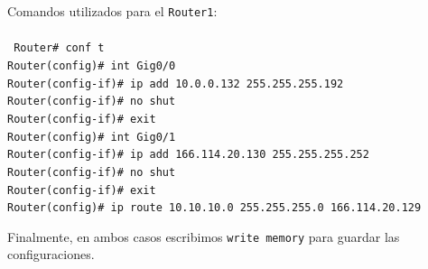 \pagebreak
Comandos utilizados para el \texttt{Router1}: \\{ }\\
\texttt{
\noindent
Router\# conf t \\
Router(config)\# int Gig0/0 \\
Router(config-if)\# ip add 10.0.0.132 255.255.255.192 \\
Router(config-if)\# no shut \\
Router(config-if)\# exit \\
Router(config)\# int Gig0/1 \\
Router(config-if)\# ip add 166.114.20.130 255.255.255.252 \\
Router(config-if)\# no shut \\
Router(config-if)\# exit \\
Router(config)\# ip route 10.10.10.0 255.255.255.0 166.114.20.129 \\
}

Finalmente, en ambos casos escribimos \texttt{write memory} para guardar las configuraciones.